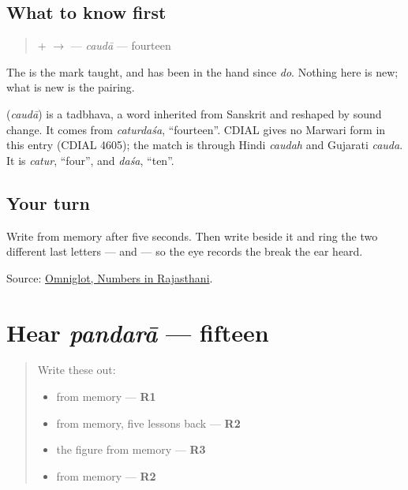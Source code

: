 \subsection*{What to know first}
\begin{quote}
\textbf{} + \textbf{} $\to$ \textbf{} — \emph{caudā} — fourteen
\end{quote}

The \textbf{} is the mark \textbf{} taught, and \textbf{} has been in the hand since \emph{do}. Nothing here is new; what is new is the pairing.

\begin{cousinweb}
\textbf{} (\emph{caudā}) is a tadbhava, a word inherited from Sanskrit and reshaped by sound change. It comes from \emph{caturdaśa}, \textquotedblleft{}fourteen\textquotedblright{}. CDIAL gives no Marwari form in this entry (CDIAL 4605); the match is through Hindi \emph{caudah} and Gujarati \emph{cauda}. It is \emph{catur}, \textquotedblleft{}four\textquotedblright{}, and \emph{daśa}, \textquotedblleft{}ten\textquotedblright{}.
\end{cousinweb}

\subsection*{Your turn}
Write \textbf{} from memory after five seconds. Then write \textbf{} beside it and ring the two different last letters — \textbf{} and \textbf{} — so the eye records the break the ear heard.

\begin{tcolorbox}[breakable,colback=teal!4,colframe=teal!35!black,title={Before you move on}]
Source: \href{https://www.omniglot.com/language/numbers/rajasthani.htm}{Omniglot, Numbers in Rajasthani}.
\end{tcolorbox}
\section[pandarā]{Hear \emph{pandarā} — fifteen}

\label{lesson:MW-C37-hear-pandara}



\begin{quote}
Write these out:

\begin{itemize}
\raggedright
  \item \textbf{} from memory — \textbf{R1}
  \item \textbf{} from memory, five lessons back — \textbf{R2}
  \item the figure \textbf{} from memory — \textbf{R3}
  \item \textbf{} from memory — \textbf{R2}
\end{itemize}
\end{quote}

